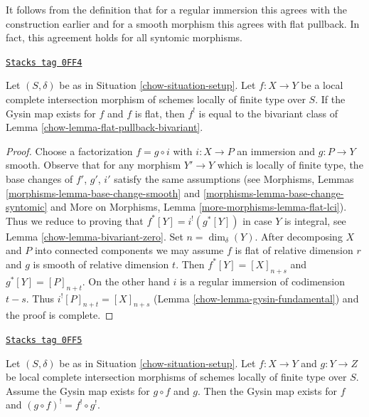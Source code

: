 It follows from the definition that for a regular immersion
this agrees with the construction earlier and for a smooth
morphism this agrees with flat pullback. In fact, this agreement
holds for all syntomic morphisms.

\begin{lemma}
\label{chow-lemma-lci-gysin-flat}
\href{https://stacks.math.columbia.edu/tag/0FF4}{\texttt{Stacks tag 0FF4}}

Let $(S, \delta)$ be as in Situation \ref{chow-situation-setup}.
Let $f : X \to Y$ be a local complete intersection morphism
of schemes locally of finite type over $S$. If the Gysin map
exists for $f$ and $f$ is flat, then $f^!$ is equal to the
bivariant class of Lemma \ref{chow-lemma-flat-pullback-bivariant}.
\end{lemma}

\begin{proof}

Choose a factorization $f = g \circ i$ with $i : X \to P$
an immersion and $g : P \to Y$ smooth. Observe that for
any morphism $Y' \to Y$ which is locally of finite type,
the base changes of $f'$, $g'$, $i'$ satisfy the same
assumptions (see Morphisms, Lemmas \ref{morphisms-lemma-base-change-smooth}
and \ref{morphisms-lemma-base-change-syntomic} and
More on Morphisms, Lemma \ref{more-morphisms-lemma-flat-lci}).
Thus we reduce to proving that $f^*[Y] = i^!(g^*[Y])$ in case $Y$
is integral, see Lemma \ref{chow-lemma-bivariant-zero}. Set $n = \dim_\delta(Y)$.
After decomposing $X$ and $P$ into connected components we
may assume $f$ is flat of relative dimension $r$ and
$g$ is smooth of relative dimension $t$.
Then $f^*[Y] = [X]_{n + s}$ and $g^*[Y] = [P]_{n + t}$.
On the other hand $i$ is a regular immersion of codimension $t - s$.
Thus $i^![P]_{n + t} = [X]_{n + s}$ (Lemma \ref{chow-lemma-gysin-fundamental})
and the proof is complete.
\end{proof}

\begin{lemma}
\label{chow-lemma-lci-gysin-composition}
\href{https://stacks.math.columbia.edu/tag/0FF5}{\texttt{Stacks tag 0FF5}}

Let $(S, \delta)$ be as in Situation \ref{chow-situation-setup}.
Let $f : X \to Y$ and $g : Y \to Z$ be local complete intersection morphisms
of schemes locally of finite type over $S$. Assume the Gysin
map exists for $g \circ f$ and $g$. Then the Gysin map exists for $f$
and $(g \circ f)^! = f^! \circ g^!$.
\end{lemma}

